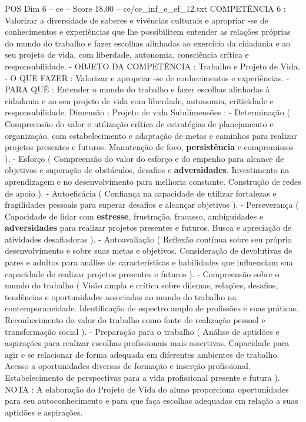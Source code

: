\begin{textsample}{POS Dim 6 – ce – Score 18.00 – ce/ce\_inf\_e\_ef\_12.txt}
COMPETÊNCIA 6 : Valorizar a diversidade de saberes e vivências culturais e apropriar -se de conhecimentos e experiências que lhe possibilitem entender as relações próprias do mundo do trabalho e fazer escolhas alinhadas ao exercício da cidadania e ao seu projeto de vida, com liberdade, autonomia, consciência crítica e responsabilidade. - OBJETO DA COMPETÊNCIA : Trabalho e Projeto de Vida. - O QUE FAZER : Valorizar e apropriar -se de conhecimentos e experiências. - PARA QUÊ : Entender o mundo do trabalho e fazer escolhas alinhadas à cidadania e ao seu projeto de vida com liberdade, autonomia, criticidade e responsabilidade.
Dimensão : Projeto de vida Subdimensões : - Determinação ( Compreensão do valor e utilização crítica de estratégias de planejamento e organização, com estabelecimento e adaptação de metas e caminhos para realizar projetos presentes e futuros.
Manutenção de foco, \textbf{persistência} e compromissos ). - Esforço ( Compreensão do valor do esforço e do empenho para alcance de objetivos e superação de obstáculos, desafios e \textbf{adversidades}.
Investimento na aprendizagem e no desenvolvimento para melhoria constante.
Construção de redes de apoio ). - Autoeficácia ( Confiança na capacidade de utilizar fortalezas e fragilidades pessoais para superar desafios e alcançar objetivos ). - Perseverança ( Capacidade de lidar com \textbf{estresse}, frustração, fracasso, ambiguidades e \textbf{adversidades} para realizar projetos presentes e futuros.
Busca e apreciação de atividades desafiadoras ). - Autoavaliação ( Reflexão contínua sobre seu próprio desenvolvimento e sobre suas metas e objetivos.
Consideração de devolutivas de pares e adultos para análise de características e habilidades que influenciam sua capacidade de realizar projetos presentes e futuros ). - Compreensão sobre o mundo do trabalho ( Visão ampla e crítica sobre dilemas, relações, desafios, tendências e oportunidades associadas ao mundo do trabalho na contemporaneidade.
Identificação de espectro amplo de profissões e suas práticas.
Reconhecimento do valor do trabalho como fonte de realização pessoal e transformação social ). - Preparação para o trabalho ( Análise de aptidões e aspirações para realizar escolhas profissionais mais assertivas.
Capacidade para agir e se relacionar de forma adequada em diferentes ambientes de trabalho.
Acesso a oportunidades diversas de formação e inserção profissional.
Estabelecimento de perspectivas para a vida profissional presente e futura ).
NOTA : A elaboração do Projeto de Vida do aluno proporciona oportunidades para seu autoconhecimento e para que faça escolhas adequadas em relação a suas aptidões e aspirações.

\end{textsample}
